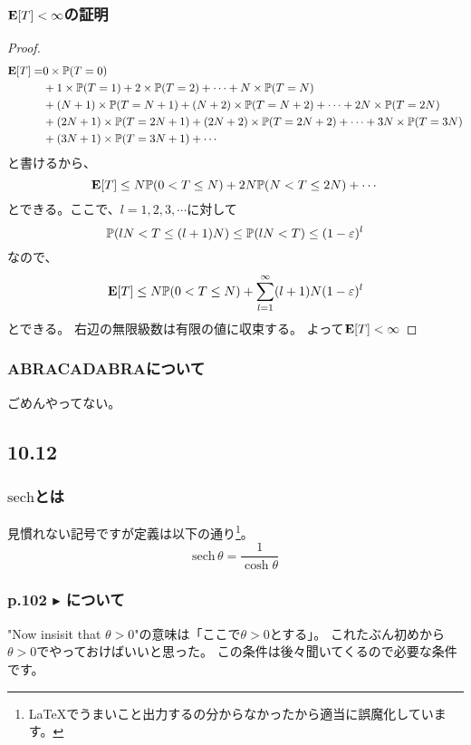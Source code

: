       \subsubsection{${\mathbf{E}}[T] < \infty$の証明}
        \begin{proof}
          \begin{align*}
            {\mathbf{E}}[T] =& 0 \times {\mathbb{P}}(T = 0) \\
            &+ 1 \times {\mathbb{P}}(T = 1) + 2 \times {\mathbb{P}}(T = 2) + \cdots + N \times {\mathbb{P}}(T = N)\\
            &+ (N + 1) \times {\mathbb{P}}(T = N + 1) + (N + 2) \times {\mathbb{P}}(T = N + 2) + \cdots + 2N \times {\mathbb{P}}(T = 2N)\\
            &+ (2N + 1) \times {\mathbb{P}}(T = 2N + 1) + (2N + 2) \times {\mathbb{P}}(T = 2N + 2) + \cdots + 3N \times {\mathbb{P}}(T = 3N)\\
            &+ (3N + 1) \times {\mathbb{P}}(T = 3N + 1) + \cdots
          \end{align*}
          と書けるから、
          \[
            {\mathbf{E}}[T] \leq N{\mathbb{P}}(0<T\leq N) + 2N{\mathbb{P}}(N< T \leq 2N) + \cdots
          \]
          とできる。ここで、$l = 1,2,3,\cdots$に対して
          \[
            {\mathbb{P}}(lN < T \leq (l + 1)N) \leq {\mathbb{P}}(lN < T) \leq (1 - \varepsilon)^l
          \]
          なので、
          \[
            {\mathbf{E}}[T] \leq
            N{\mathbb{P}}(0 < T \leq N)
            + \sum_{l = 1}^{\infty}(l + 1)N(1 - \varepsilon)^l
          \]
          とできる。
          右辺の無限級数は有限の値に収束する。
          よって${\mathbf{E}}[T] < \infty$
        \end{proof}

        \subsubsection{ABRACADABRAについて}
          ごめんやってない。

    \subsection{10.12}
      \subsubsection{$\text{sech}$とは}
          見慣れない記号ですが定義は以下の通り\footnote{\LaTeX でうまいこと出力するの分からなかったから適当に誤魔化しています。}。
        \[
          \text{sech} \, \theta = \frac{1}{\cosh \theta}
          \]

      \subsubsection{p.102 $\blacktriangleright$ について}
          "Now insisit that $\theta > 0$"の意味は「ここで$\theta > 0$とする」。
          これたぶん初めから$\theta > 0$でやっておけばいいと思った。
          この条件は後々聞いてくるので必要な条件です。

